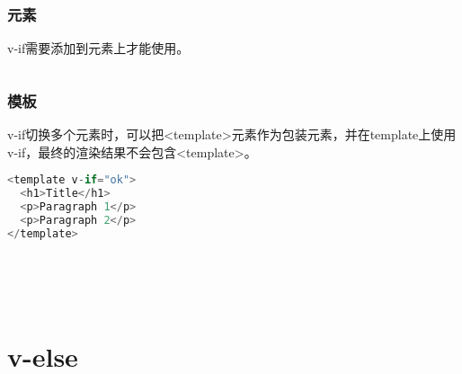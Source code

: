 \subsection{元素}

v-if需要添加到元素上才能使用。

\begin{lstlisting}[language=JavaScript]

\end{lstlisting}


\subsection{模板}

v-if切换多个元素时，可以把<template>元素作为包装元素，并在template上使用v-if，最终的渲染结果不会包含<template>。


\begin{lstlisting}[language=JavaScript]
<template v-if="ok">
  <h1>Title</h1>
  <p>Paragraph 1</p>
  <p>Paragraph 2</p>
</template>
\end{lstlisting}




\begin{lstlisting}[language=JavaScript]

\end{lstlisting}




\begin{lstlisting}[language=JavaScript]

\end{lstlisting}




\begin{lstlisting}[language=JavaScript]

\end{lstlisting}




\begin{lstlisting}[language=JavaScript]

\end{lstlisting}




\begin{lstlisting}[language=JavaScript]

\end{lstlisting}

\chapter{v-else}


